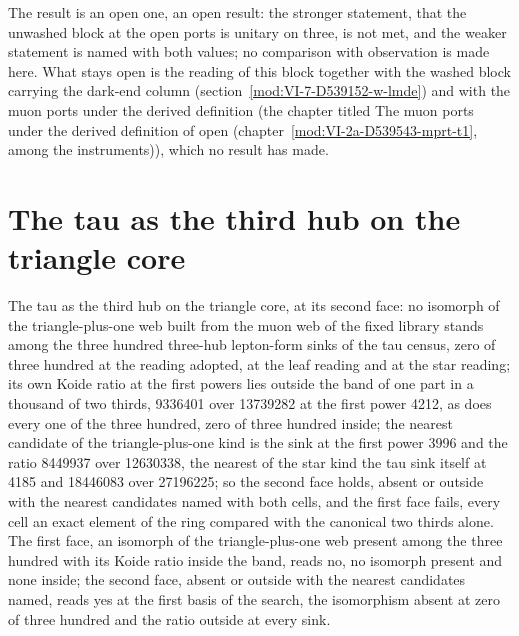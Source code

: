 The result is an open one, an open result: the stronger statement, that the unwashed block at the open ports is unitary on three, is not met, and the weaker statement is named with both values; no comparison with observation is made here.
What stays open is the reading of this block together with the washed block carrying the dark-end column (section~\ref{mod:VI-7-D539152-w-lmde}) and with the muon ports under the derived definition (the chapter titled The muon ports under the derived definition of open (chapter~\ref{mod:VI-2a-D539543-mprt-t1}, among the instruments)), which no result has made.
\section{The tau as the third hub on the triangle core}\label{mod:V-10-D540869-tthc-t1}
\begin{chtheorem}\label{box:V-10-D540869-tthc-t1:1}
The tau as the third hub on the triangle core, at its second face: no isomorph of the triangle-plus-one web built from the muon web of the fixed library stands among the three hundred three-hub lepton-form sinks of the tau census, zero of three hundred at the reading adopted, at the leaf reading and at the star reading; its own Koide ratio at the first powers lies outside the band of one part in a thousand of two thirds, 9336401 over 13739282 at the first power 4212, as does every one of the three hundred, zero of three hundred inside; the nearest candidate of the triangle-plus-one kind is the sink at the first power 3996 and the ratio 8449937 over 12630338, the nearest of the star kind the tau sink itself at 4185 and 18446083 over 27196225; so the second face holds, absent or outside with the nearest candidates named with both cells, and the first face fails, every cell an exact element of the ring compared with the canonical two thirds alone.
The first face, an isomorph of the triangle-plus-one web present among the three hundred with its Koide ratio inside the band, reads no, no isomorph present and none inside; the second face, absent or outside with the nearest candidates named, reads yes at the first basis of the search, the isomorphism absent at zero of three hundred and the ratio outside at every sink.
\end{chtheorem}

